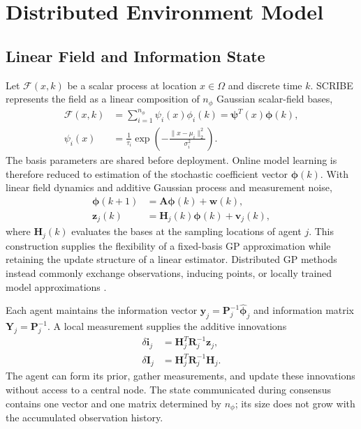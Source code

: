 \documentclass[letterpaper,10pt,conference]{ieeeconf}
\begin{document}
\section{Distributed Environment Model}

\subsection{Linear Field and Information State}

Let $\mathcal{F}(x,k)$ be a scalar process at location $x\in\Omega$ and
discrete time $k$. SCRIBE represents the field as a linear composition of
$n_{\phi}$ Gaussian scalar-field bases,
\begin{align}
    \mathcal{F}(x,k)
    &=\sum_{i=1}^{n_{\phi}}\psi_i(x)\phi_i(k)
      =\bm{\psi}^{T}(x)\bm{\phi}(k),\\
    \psi_i(x)
    &=\frac{1}{\tau_i}
      \exp\left(-\frac{\lVert x-\mu_i\rVert_2^2}{\sigma_i^2}\right).
    \label{eq:field-model}
\end{align}
The basis parameters are shared before deployment. Online model learning is
therefore reduced to estimation of the stochastic coefficient vector
$\bm{\phi}(k)$. With linear field dynamics and additive Gaussian process and
measurement noise,
\begin{align}
    \bm{\phi}(k+1) &= \bm{A}\bm{\phi}(k)+\bm{w}(k),\\
    \bm{z}_j(k) &= \bm{H}_j(k)\bm{\phi}(k)+\bm{v}_j(k),
    \label{eq:state-observation}
\end{align}
where $\bm{H}_j(k)$ evaluates the bases at the sampling locations of agent
$j$. This construction supplies the flexibility of a fixed-basis GP
approximation while retaining the update structure of a linear estimator.
Distributed GP methods instead commonly exchange observations, inducing
points, or locally trained model approximations
\cite{allamraju2017communication}.

Each agent maintains the information vector
$\bm{y}_j=\bm{P}_j^{-1}\hat{\bm{\phi}}_j$ and information matrix
$\bm{Y}_j=\bm{P}_j^{-1}$. A local measurement supplies the additive
innovations
\begin{align}
    \delta\bm{i}_j &=
    \bm{H}_j^T\bm{R}_j^{-1}\bm{z}_j,\\
    \delta\bm{I}_j &=
    \bm{H}_j^T\bm{R}_j^{-1}\bm{H}_j.
    \label{eq:information-innovation}
\end{align}
The agent can form its prior, gather measurements, and update these
innovations without access to a central node. The state communicated during
consensus contains one vector and one matrix determined by $n_{\phi}$; its
size does not grow with the accumulated observation history.
\end{document}
